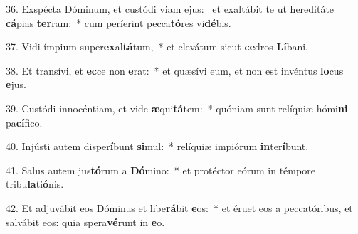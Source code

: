 36. Exspécta Dóminum, et custódi viam ejus: \dag\  et exaltábit te ut hereditáte \textbf{cá}pias \textbf{ter}ram:~*  cum períerint pecca\textbf{tó}res vi\textbf{dé}bis.\

37. Vidi ímpium super\textbf{ex}al\textbf{tá}tum,~*  et elevátum sicut \textbf{ce}dros \textbf{Lí}bani.\

38. Et transívi, et \textbf{ec}ce non \textbf{e}rat:~*  et quæsívi eum, et non est invéntus \textbf{lo}cus \textbf{e}jus.\

39. Custódi innocéntiam, et vide \textbf{æ}qui\textbf{tá}tem:~*  quóniam sunt relíquiæ hómi\textbf{ni} pa\textbf{cí}fico.\

40. Injústi autem disper\textbf{í}bunt \textbf{si}mul:~*  relíquiæ impiórum \textbf{in}ter\textbf{í}bunt.\

41. Salus autem jus\textbf{tó}rum a \textbf{Dó}mino:~*  et protéctor eórum in témpore tribu\textbf{la}ti\textbf{ó}nis.\

42. Et adjuvábit eos Dóminus et libe\textbf{rá}bit \textbf{e}os:~*  et éruet eos a peccatóribus, et salvábit eos: quia spera\textbf{vé}runt in \textbf{e}o.\

